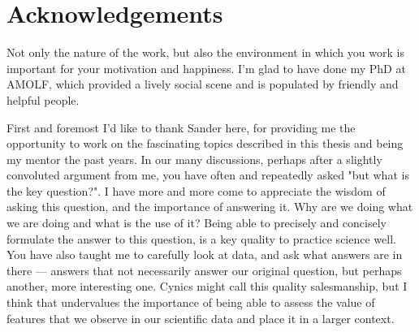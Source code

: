 


































\chapter*{Acknowledgements}

Not only the nature of the work, but also the environment in which you work is important for your motivation and happiness.
%
I'm glad to have done my PhD at AMOLF, which provided 
a lively social scene and
is populated by friendly and helpful people.



First and foremost I'd like to thank Sander here, 
for providing me the opportunity to work on the fascinating topics described in this thesis and being my mentor the past years.
%
In our many discussions,
perhaps after a slightly convoluted argument from me,  
you have often and repeatedly asked "but what is the key question?".
%
I have more and more come to appreciate the wisdom of asking this question, 
and the importance of answering it.
Why are we doing what we are doing and what is the use of it?
Being able to precisely and concisely formulate the answer to this question, 
is a key quality to practice science well. 
%
You have also taught me to carefully look at data,
and ask what answers are in there --- 
answers that not necessarily answer our original question,
but perhaps another, more interesting one. 
%
Cynics might call this quality salesmanship,
but I think that undervalues the importance
of being able to assess the value of features that we observe in our scientific data and place it in a larger context.

